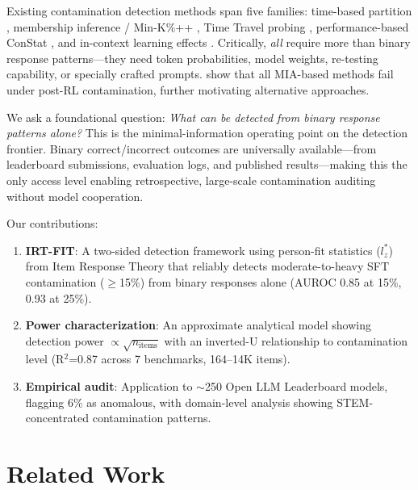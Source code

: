 \documentclass[11pt,a4paper]{article}
\begin{document}
Existing contamination detection methods span five families: time-based partition \citep{golchin2024time}, membership inference / Min-K\%++ \citep{shi2024detecting}, Time Travel probing \citep{dong2024generalization}, performance-based ConStat \citep{dekoninck2024constat}, and in-context learning effects \citep{dong2024codec}. Critically, \emph{all} require more than binary response patterns---they need token probabilities, model weights, re-testing capability, or specially crafted prompts. \citet{wang2025post} show that all MIA-based methods fail under post-RL contamination, further motivating alternative approaches.

We ask a foundational question: \emph{What can be detected from binary response patterns alone?} This is the minimal-information operating point on the detection frontier. Binary correct/incorrect outcomes are universally available---from leaderboard submissions, evaluation logs, and published results---making this the only access level enabling retrospective, large-scale contamination auditing without model cooperation.

Our contributions:
\begin{enumerate}[nosep,leftmargin=*]
\item \textbf{IRT-FIT}: A two-sided detection framework using person-fit statistics ($l_z^*$) from Item Response Theory that reliably detects moderate-to-heavy SFT contamination ($\geq$15\%) from binary responses alone (AUROC 0.85 at 15\%, 0.93 at 25\%).
\item \textbf{Power characterization}: An approximate analytical model showing detection power $\propto \sqrt{n_{\text{items}}}$ with an inverted-U relationship to contamination level (R$^2$=0.87 across 7 benchmarks, 164--14K items).
\item \textbf{Empirical audit}: Application to ${\sim}$250 Open LLM Leaderboard models, flagging 6\% as anomalous, with domain-level analysis showing STEM-concentrated contamination patterns.
\end{enumerate}

\section{Related Work}
\end{document}
